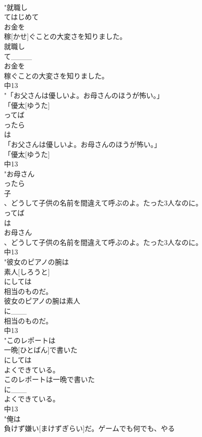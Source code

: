 \documentclass[8pt]{extreport}
\begin{document}
\begin{CJK}{UTF8}{min}
\\	"就職し
\\	てはじめて
\\	お金を
\\	稼[かせ]ぐことの大変さを知りました。
\\	就職し
\\	て____
\\	お金を
\\	稼ぐことの大変さを知りました。
\\	中13
\\	"「お父さんは優しいよ。お母さんのほうが怖い。」
\\	「優太[ゆうた]
\\	ってば
\\	ったら
\\	は 
\\	「お父さんは優しいよ。お母さんのほうが怖い。」
\\	「優太[ゆうた]
\\	中13
\\	"お母さん
\\	ったら
\\	子
\\	、どうして子供の名前を間違えて呼ぶのよ。たった3人なのに。
\\	ってば
\\	は 
\\	お母さん
\\	、どうして子供の名前を間違えて呼ぶのよ。たった3人なのに。
\\	中13
\\	"彼女のピアノの腕は
\\	素人[しろうと]
\\	にしては
\\	相当のものだ。
\\	彼女のピアノの腕は素人
\\	に___
\\	相当のものだ。
\\	中13
\\	"このレポートは
\\	一晩[ひとばん]で書いた
\\	にしては
\\	よくできている。
\\	このレポートは一晩で書いた
\\	に___
\\	よくできている。
\\	中13
\\	"俺は
\\	負けず嫌い[まけずぎらい]だ。ゲームでも何でも、やる

\end{CJK}
\end{document}
